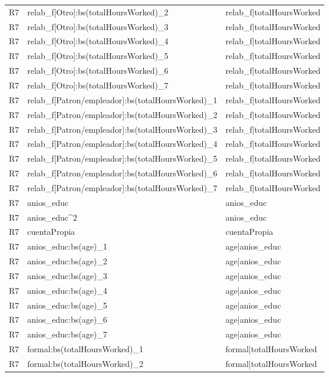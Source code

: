 \begin{longtable}{lll}
R7 & relab\_f[Otro]:bs(totalHoursWorked)\_2 & relab\_f|totalHoursWorked \\
R7 & relab\_f[Otro]:bs(totalHoursWorked)\_3 & relab\_f|totalHoursWorked \\
R7 & relab\_f[Otro]:bs(totalHoursWorked)\_4 & relab\_f|totalHoursWorked \\
R7 & relab\_f[Otro]:bs(totalHoursWorked)\_5 & relab\_f|totalHoursWorked \\
R7 & relab\_f[Otro]:bs(totalHoursWorked)\_6 & relab\_f|totalHoursWorked \\
R7 & relab\_f[Otro]:bs(totalHoursWorked)\_7 & relab\_f|totalHoursWorked \\
R7 & relab\_f[Patron/empleador]:bs(totalHoursWorked)\_1 & relab\_f|totalHoursWorked \\
R7 & relab\_f[Patron/empleador]:bs(totalHoursWorked)\_2 & relab\_f|totalHoursWorked \\
R7 & relab\_f[Patron/empleador]:bs(totalHoursWorked)\_3 & relab\_f|totalHoursWorked \\
R7 & relab\_f[Patron/empleador]:bs(totalHoursWorked)\_4 & relab\_f|totalHoursWorked \\
R7 & relab\_f[Patron/empleador]:bs(totalHoursWorked)\_5 & relab\_f|totalHoursWorked \\
R7 & relab\_f[Patron/empleador]:bs(totalHoursWorked)\_6 & relab\_f|totalHoursWorked \\
R7 & relab\_f[Patron/empleador]:bs(totalHoursWorked)\_7 & relab\_f|totalHoursWorked \\
R7 & anios\_educ & anios\_educ \\
R7 & anios\_educ\textasciicircum 2 & anios\_educ \\
R7 & cuentaPropia & cuentaPropia \\
R7 & anios\_educ:bs(age)\_1 & age|anios\_educ \\
R7 & anios\_educ:bs(age)\_2 & age|anios\_educ \\
R7 & anios\_educ:bs(age)\_3 & age|anios\_educ \\
R7 & anios\_educ:bs(age)\_4 & age|anios\_educ \\
R7 & anios\_educ:bs(age)\_5 & age|anios\_educ \\
R7 & anios\_educ:bs(age)\_6 & age|anios\_educ \\
R7 & anios\_educ:bs(age)\_7 & age|anios\_educ \\
R7 & formal:bs(totalHoursWorked)\_1 & formal|totalHoursWorked \\
R7 & formal:bs(totalHoursWorked)\_2 & formal|totalHoursWorked \\

\end{longtable}
